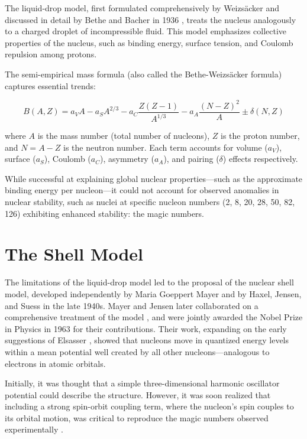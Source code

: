 The liquid-drop model, first formulated comprehensively by Weizsäcker \cite{Weizsacker_1935} and discussed in detail by Bethe and Bacher in 1936 \cite{bethe_nuclear_1936}, treats the nucleus analogously to a charged droplet of incompressible fluid. This model emphasizes collective properties of the nucleus, such as binding energy, surface tension, and Coulomb repulsion among protons.

The semi-empirical mass formula (also called the Bethe-Weizsäcker formula) captures essential trends:

\[B(A,Z) = a_VA - a_SA^{2/3} - a_C\frac{Z(Z-1)}{A^{1/3}} - a_A\frac{(N-Z)^2}{A}\pm \delta(N,Z)\]

where $A$ is the mass number (total number of nucleons), $Z$ is the proton number, and $N = A - Z$ is the neutron number. Each term accounts for volume ($a_V$), surface ($a_S$), Coulomb ($a_C$), asymmetry ($a_A$), and pairing ($\delta$) effects respectively.

While successful at explaining global nuclear properties—such as the approximate binding energy per nucleon—it could not account for observed anomalies in nuclear stability, such as nuclei at specific nucleon numbers (2, 8, 20, 28, 50, 82, 126) exhibiting enhanced stability: the magic numbers.

\section{The Shell Model}

The limitations of the liquid-drop model led to the proposal of the nuclear shell model, developed independently by Maria Goeppert Mayer \cite{mayer_1948} and by Haxel, Jensen, and Suess \cite{haxel_magic_nodate} in the late 1940s. Mayer and Jensen later collaborated on a comprehensive treatment of the model \cite{MayerandJensen_1955}, and were jointly awarded the Nobel Prize in Physics in 1963 for their contributions. Their work, expanding on the early suggestions of Elsasser \cite{elsasser_sur_1933}, showed that nucleons move in quantized energy levels within a mean potential well created by all other nucleons—analogous to electrons in atomic orbitals.

Initially, it was thought that a simple three-dimensional harmonic oscillator potential could describe the structure. However, it was soon realized that including a strong spin-orbit coupling term, where the nucleon's spin couples to its orbital motion, was critical to reproduce the magic numbers observed experimentally \cite{mayer_shell_1968}.

